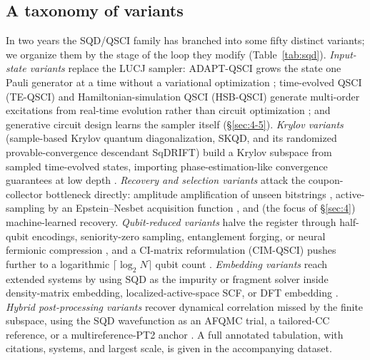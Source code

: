 \documentclass[11pt]{article}
\begin{document}
\subsection{A taxonomy of variants}\label{sec:2-2}

In two years the SQD/QSCI family has branched into some fifty distinct variants; we organize them by the stage of the loop they modify (Table~\ref{tab:sqd}). \emph{Input-state variants} replace the LUCJ sampler: ADAPT-QSCI grows the state one Pauli generator at a time without a variational optimization \cite{nakagawa2024}; time-evolved QSCI (TE-QSCI) and Hamiltonian-simulation QSCI (HSB-QSCI) generate multi-order excitations from real-time evolution rather than circuit optimization \cite{mikkelsen2025,sugisaki2025}; and generative circuit design learns the sampler itself (\S\ref{sec:4-5}). \emph{Krylov variants} (sample-based Krylov quantum diagonalization, SKQD, and its randomized provable-convergence descendant SqDRIFT) build a Krylov subspace from sampled time-evolved states, importing phase-estimation-like convergence guarantees at low depth \cite{yu2025,piccinelli2025}. \emph{Recovery and selection variants} attack the coupon-collector bottleneck directly: amplitude amplification of unseen bitstrings \cite{stockinger2026}, active-sampling by an Epstein--Nesbet acquisition function \cite{miura2026}, and (the focus of \S\ref{sec:4}) machine-learned recovery. \emph{Qubit-reduced variants} halve the register through half-qubit encodings, seniority-zero sampling, entanglement forging, or neural fermionic compression \cite{mcfarthing2026,yoshida2026,smith2025,chen2025}, and a CI-matrix reformulation (CIM-QSCI) pushes further to a logarithmic $\lceil\log_2 N\rceil$ qubit count \cite{graves2026}. \emph{Embedding variants} reach extended systems by using SQD as the impurity or fragment solver inside density-matrix embedding, localized-active-space SCF, or DFT embedding \cite{shajan2025,wang2026}. \emph{Hybrid post-processing variants} recover dynamical correlation missed by the finite subspace, using the SQD wavefunction as an AFQMC trial, a tailored-CC reference, or a multireference-PT2 anchor \cite{danilov2025,erhart2025}. A full annotated tabulation, with citations, systems, and largest scale, is given in the accompanying dataset.
\end{document}
